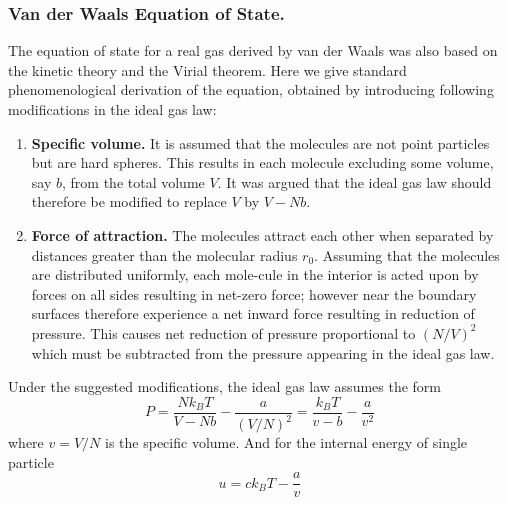 \documentclass[../../../Main.tex]{subfiles}
\begin{document}
\subsubsection*{Van der Waals Equation of State.} The equation of state for a real gas derived by van der Waals was also based on the kinetic theory and the Virial theorem. Here we give standard phenomenological derivation of the equation, obtained by introducing following modifications in the ideal gas law:
\begin{enumerate}
    \item \textbf{Specific volume.} It is assumed that the molecules are not point particles but are hard spheres. This results in each molecule excluding some volume, say $b$, from the total volume $V$. It was argued that the ideal gas law should therefore be modified to replace $V$ by $V - N b$.
    \item \textbf{Force of attraction.} The molecules attract each other when separated by distances greater than the molecular radius $r_0$. Assuming that the molecules are distributed uniformly, each mole-cule in the interior is acted upon by forces on all sides resulting in net-zero force; however near the boundary surfaces therefore experience a net inward force resulting in reduction of pressure. This causes net reduction of pressure proportional to $(N /V )^2$ which must be subtracted from the pressure appearing in the ideal gas law.
\end{enumerate}
Under the suggested modifications, the ideal gas law assumes the form
\begin{equation*}
    P=\frac{Nk_B T}{V-Nb}-\frac{a}{(V/N)^2}=\frac{k_BT}{v-b}- \frac{a}{v^2}
\end{equation*}
where $v=V/N$ is the specific volume. And for the internal energy of single particle
\begin{equation*}
    u=ck_BT-\frac{a}{v}
\end{equation*}
\end{document}
